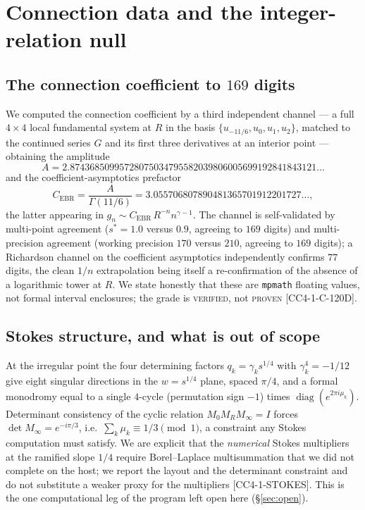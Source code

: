 \documentclass[11pt,reqno]{amsart}
\theoremstyle{plain}
\theoremstyle{definition}
\theoremstyle{remark}
\DeclareMathOperator{\Det}{det}
\newcommand{\Cebr}{C_{\mathrm{EBR}}}
\newcommand{\claim}[1]{\textsf{\small[#1]}}
\begin{document}
\section{Connection data and the integer-relation null}\label{sec:numerics}

\subsection{The connection coefficient to $169$ digits}
We computed the connection coefficient by a third independent channel --- a
full $4\times4$ local fundamental system at $R$ in the basis
$\{u_{-11/6},u_{0},u_{1},u_{2}\}$, matched to the continued series $G$ and its
first three derivatives at an interior point --- obtaining the amplitude
\[
  A=2.87436850995728075034795582039806005699192841843121\ldots
\]
and the coefficient-asymptotics prefactor
\[
  \Cebr=\frac{A}{\Gamma(11/6)}
       =3.055706807890481365701912201727\ldots,
\]
the latter appearing in $g_{n}\sim\Cebr\,R^{-n}n^{\gamma-1}$. The channel is
self-validated by multi-point agreement ($s^{*}=1.0$ versus $0.9$, agreeing to
$169$ digits) and multi-precision agreement (working precision $170$ versus
$210$, agreeing to $169$ digits); a Richardson channel on the coefficient
asymptotics independently confirms $77$ digits, the clean $1/n$ extrapolation
being itself a re-confirmation of the absence of a logarithmic tower at $R$. We
state honestly that these are \texttt{mpmath} floating values, not formal
interval enclosures; the grade is \textsc{verified}, not \textsc{proven}
\claim{CC4-1-C-120D}.

\subsection{Stokes structure, and what is out of scope}\label{sec:stokes}
At the irregular point the four determining factors $q_{k}=\gamma_{k}s^{1/4}$
with $\gamma_{k}^{4}=-1/12$ give eight singular directions in the
$w=s^{1/4}$ plane, spaced $\pi/4$, and a formal monodromy equal to a single
$4$-cycle (permutation sign $-1$) times $\operatorname{diag}(e^{2\pi i\mu_{k}})$.
Determinant consistency of the cyclic relation $M_{0}M_{R}M_{\infty}=I$ forces
$\Det M_{\infty}=e^{-i\pi/3}$, i.e.\ $\sum_{k}\mu_{k}\equiv1/3\pmod 1$, a
constraint any Stokes computation must satisfy. We are explicit that the
\emph{numerical} Stokes multipliers at the ramified slope $1/4$ require
Borel--Laplace multisummation that we did not complete on the host; we report
the layout and the determinant constraint and do not substitute a weaker proxy
for the multipliers \claim{CC4-1-STOKES}. This is the one computational leg of
the program left open here (\S\ref{sec:open}).
\end{document}
